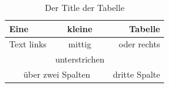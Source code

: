\documentclass[a4paper,12pt]{article}
\begin{document}
\begin{table}
\caption{Der Title der Tabelle}
\label{tab:Tabelle}
\centering
 \begin{tabular}{lc|r}
   Eine & kleine & Tabelle\\
\hline
   Text links & mittig & oder rechts \\
   & unterstrichen  & \\
\cline{2-2}
   \multicolumn{2}{c|}{\"uber zwei Spalten} & dritte Spalte \\
\end{tabular}   
\end{table}

   
\end{document}
